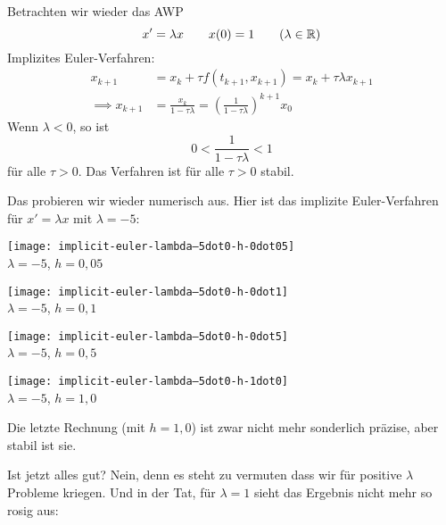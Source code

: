 Betrachten wir wieder das AWP
\begin{equation*}
	x' =\lambda x\qquad x(0)=1\qquad (\lambda \in \mathbb R)
\end{equation*}
Implizites Euler-Verfahren: 
\begin{align*}
	x_{k+1} & =x_k+\tau f \left(t_{k+1},x_{k+1} \right)=x_k+\tau \lambda x_{k+1} \\
	\implies x_{k+1} & =\frac{x_k}{1-\tau \lambda}=\left(\frac{1}{1-\tau \lambda} \right)^{k+1}x_0
\end{align*}
Wenn $\lambda <0$, so ist 
\begin{equation*}
	0<\frac{1}{1-\tau \lambda} <1
\end{equation*}
für alle $\tau >0$. Das Verfahren ist für alle $\tau > 0$ stabil.

Das probieren wir wieder numerisch aus. Hier ist das implizite Euler-Verfahren
für $x' = \lambda x$ mit $\lambda = -5$:

\begin{center}
	\begin{minipage}{0.49\textwidth}
		\centering
		\texttt{[image: implicit-euler-lambda--5dot0-h-0dot05]} \\
		$\lambda=-5$, $h = 0{,}05$
	\end{minipage}
	\begin{minipage}{0.49\textwidth}
		\centering
		\texttt{[image: implicit-euler-lambda--5dot0-h-0dot1]} \\
		$\lambda=-5$, $h = 0{,}1$
	\end{minipage}
\end{center}

\begin{center}
	\begin{minipage}{0.49\textwidth}
		\centering
		\texttt{[image: implicit-euler-lambda--5dot0-h-0dot5]} \\
		$\lambda=-5$, $h = 0{,}5$
	\end{minipage}
	\begin{minipage}{0.49\textwidth}
		\texttt{[image: implicit-euler-lambda--5dot0-h-1dot0]} \\	
		$\lambda=-5$, $h = 1{,}0$
	\end{minipage}
\end{center}

Die letzte Rechnung (mit $h=1{,}0$) ist zwar nicht mehr sonderlich präzise,
aber stabil ist sie.

Ist jetzt alles gut?  Nein, denn es steht zu vermuten dass wir für positive $\lambda$ Probleme kriegen.  Und in der Tat, für $\lambda = 1$ sieht das Ergebnis nicht mehr so rosig aus:

